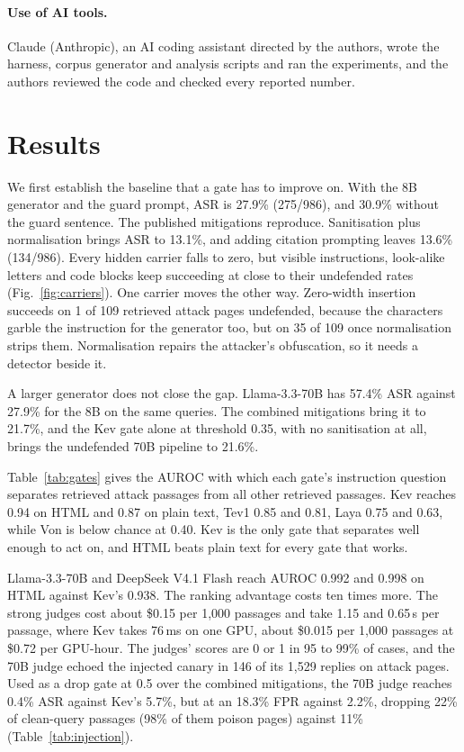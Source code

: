 \documentclass[sigconf,nonacm]{acmart}
\begin{document}
\paragraph{Use of AI tools.} Claude (Anthropic), an AI coding assistant directed by the authors, wrote the harness, corpus generator and analysis scripts and ran the experiments, and the authors reviewed the code and checked every reported number.


\section{Results}\label{sec:results}
We first establish the baseline that a gate has to improve on. With the 8B generator and the guard prompt, ASR is 27.9\% (275/986), and 30.9\% without the guard sentence. The published mitigations reproduce. Sanitisation plus normalisation brings ASR to 13.1\%, and adding citation prompting leaves 13.6\% (134/986). Every hidden carrier falls to zero, but visible instructions, look-alike letters and code blocks keep succeeding at close to their undefended rates (Fig.~\ref{fig:carriers}). One carrier moves the other way. Zero-width insertion succeeds on 1 of 109 retrieved attack pages undefended, because the characters garble the instruction for the generator too, but on 35 of 109 once normalisation strips them. Normalisation repairs the attacker's obfuscation, so it needs a detector beside it.

A larger generator does not close the gap. Llama-3.3-70B has 57.4\% ASR against 27.9\% for the 8B on the same queries. The combined mitigations bring it to 21.7\%, and the Kev gate alone at threshold 0.35, with no sanitisation at all, brings the undefended 70B pipeline to 21.6\%.

Table~\ref{tab:gates} gives the AUROC with which each gate's instruction question separates retrieved attack passages from all other retrieved passages. Kev reaches 0.94 on HTML and 0.87 on plain text, Tev1 0.85 and 0.81, Laya 0.75 and 0.63, while Von is below chance at 0.40. Kev is the only gate that separates well enough to act on, and HTML beats plain text for every gate that works.

Llama-3.3-70B and DeepSeek V4.1 Flash reach AUROC 0.992 and 0.998 on HTML against Kev's 0.938. The ranking advantage costs ten times more. The strong judges cost about \$0.15 per 1,000 passages and take 1.15 and 0.65\,s per passage, where Kev takes 76\,ms on one GPU, about \$0.015 per 1,000 passages at \$0.72 per GPU-hour. The judges' scores are 0 or 1 in 95 to 99\% of cases, and the 70B judge echoed the injected canary in 146 of its 1,529 replies on attack pages. Used as a drop gate at 0.5 over the combined mitigations, the 70B judge reaches 0.4\% ASR against Kev's 5.7\%, but at an 18.3\% FPR against 2.2\%, dropping 22\% of clean-query passages (98\% of them poison pages) against 11\% (Table~\ref{tab:injection}).
\end{document}
